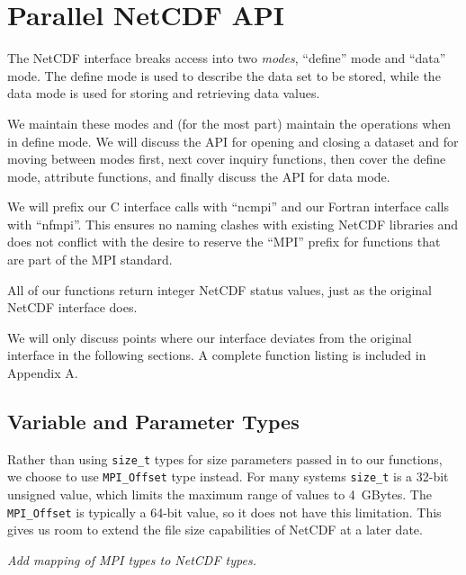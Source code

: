 \documentclass[10pt]{article}
\begin{document}

\section{Parallel NetCDF API}

The NetCDF interface breaks access into two \emph{modes}, ``define'' mode and
``data'' mode.  The define mode is used to describe the data set to be stored,
while the data mode is used for storing and retrieving data values.

We maintain these modes and (for the most part) maintain the operations when
in define mode.  We will discuss the API for opening and closing a dataset and
for moving between modes first, next cover inquiry functions, then cover the
define mode, attribute functions, and finally discuss the API for data mode.

%
%
We will prefix our C interface calls with ``ncmpi'' and our Fortran interface
calls with ``nfmpi''.  This ensures no naming clashes with existing NetCDF
libraries and does not conflict with the desire to reserve the ``MPI'' prefix
for functions that are part of the MPI standard.

All of our functions return integer NetCDF status values, just as the original
NetCDF interface does.

We will only discuss points where our interface deviates from the original
interface in the following sections. A complete function listing is included
in Appendix A.

\subsection{Variable and Parameter Types}

%
%
Rather than using \texttt{size\_t} types for size parameters passed in to our
functions, we choose to use \texttt{MPI\_Offset} type instead.  For many
systems \texttt{size\_t} is a 32-bit unsigned value, which limits the maximum
range of values to 4~GBytes.  The \texttt{MPI\_Offset} is typically a 64-bit
value, so it does not have this limitation.  This gives us room to extend the
file size capabilities of NetCDF at a later date.

\emph{Add mapping of MPI types to NetCDF types.}
\end{document}
